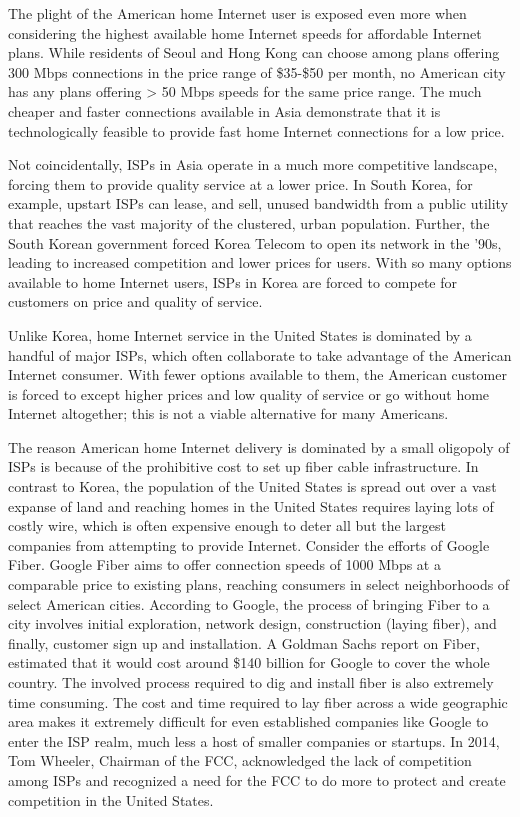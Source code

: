 \documentclass[pageno]{jpaper}
\begin{document}
The plight of the American home Internet user is exposed even more when considering the highest available home Internet speeds for affordable Internet plans. While residents of Seoul and Hong Kong can choose among plans offering 300 Mbps connections in the price range of \$35-\$50 per month, no American city has any plans offering > 50 Mbps speeds for the same price range\cite{connectivity}. The much cheaper and faster connections available in Asia demonstrate that it is technologically feasible to provide fast home Internet connections for a low price. 

Not coincidentally, ISPs in Asia operate in a much more competitive landscape, forcing them to provide quality service at a lower price. In South Korea, for example, upstart ISPs can lease, and sell, unused bandwidth from a public utility that reaches the vast majority of the clustered, urban population. Further, the South Korean government forced Korea Telecom to open its network in the '90s, leading to increased competition and lower prices for users\cite{korea}. With so many options available to home Internet users, ISPs in Korea are forced to compete for customers on price and quality of service.

Unlike Korea, home Internet service in the United States is dominated by a handful of  major ISPs, which often collaborate to take advantage of the American Internet consumer. With fewer options available to them, the American customer is forced to except higher prices and low quality of service or go without home Internet altogether; this is not a viable alternative for many Americans.

The reason American home Internet delivery is dominated by a small oligopoly of ISPs is because of the prohibitive cost to set up fiber cable infrastructure. In contrast to Korea, the population of the United States is spread out over a vast expanse of land and reaching homes in the United States requires laying lots of costly wire, which is often expensive enough to deter all but the largest companies from attempting to provide Internet. Consider the efforts of Google Fiber. Google Fiber aims to offer connection speeds of 1000 Mbps at a comparable price to existing plans, reaching consumers in select neighborhoods of select American cities\cite{google}. According to Google, the process of bringing Fiber to a city involves initial exploration, network design, construction (laying fiber), and finally, customer sign up and installation. A Goldman Sachs report on Fiber, estimated that it would cost around \$140 billion for Google to cover the whole country\cite{goldman}. The involved process required to dig and install fiber is also extremely time consuming. The cost and time required to lay fiber across a wide geographic area makes it extremely difficult for even established companies like Google to enter the ISP realm, much less a host of smaller companies or startups. In 2014, Tom Wheeler, Chairman of the FCC, acknowledged the lack of competition among ISPs and recognized a need for the FCC to do more to protect and create competition in the United States\cite{wheeler}.
\end{document}
